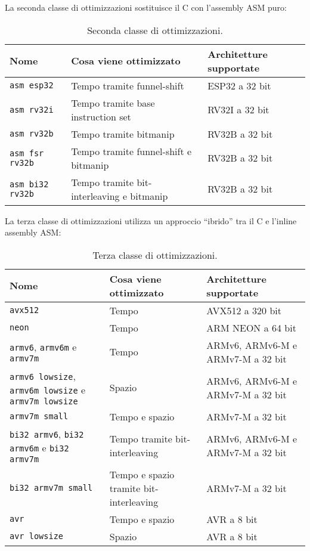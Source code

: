 \noindent La seconda classe di ottimizzazioni sostituisce il C con l'assembly ASM puro\cite{github}:
\begin{table}[H]
    \centering
	\begin{tabular}{|m{}<{\centering}||m{}<{\centering}|m{}<{\centering}|}
		\hline
		\textbf{Nome} & \textbf{Cosa viene ottimizzato} & \textbf{Architetture supportate} \\
        \hline \hline
        \texttt{asm esp32} & Tempo tramite funnel-shift & ESP32 a 32 bit \\
        \hline
        \texttt{asm rv32i} & Tempo tramite base instruction set & RV32I a 32 bit \\
        \hline
        \texttt{asm rv32b} & Tempo tramite bitmanip & RV32B a 32 bit \\
        \hline
        \texttt{asm fsr rv32b} & Tempo tramite funnel-shift e bitmanip & RV32B a 32 bit \\
        \hline
        \texttt{asm bi32 rv32b} & Tempo tramite bit-interleaving e bitmanip & RV32B a 32 bit \\
        \hline
    \end{tabular}
    \caption{Seconda classe di ottimizzazioni.}
\end{table}

\newpage

\noindent La terza classe di ottimizzazioni utilizza un approccio ``ibrido'' tra il C e l'inline assembly ASM\cite{github}:
\begin{table}[H]
    \centering
	\begin{tabular}{|m{}<{\centering}||m{}<{\centering}|m{}<{\centering}|}
		\hline
		\textbf{Nome} & \textbf{Cosa viene ottimizzato} & \textbf{Architetture supportate} \\
        \hline \hline
        \texttt{avx512} & Tempo & AVX512 a 320 bit \\
        \hline
        \texttt{neon} & Tempo & ARM NEON a 64 bit \\
        \hline
        \texttt{armv6}, \texttt{armv6m} e \texttt{armv7m} & Tempo & ARMv6, ARMv6-M e ARMv7-M a 32 bit \\
        \hline
        \texttt{armv6 lowsize}, \texttt{armv6m lowsize} e \texttt{armv7m lowsize} & Spazio & ARMv6, ARMv6-M e ARMv7-M a 32 bit \\
        \hline
        \texttt{armv7m small} & Tempo e spazio & ARMv7-M a 32 bit \\
        \hline
        \texttt{bi32 armv6}, \texttt{bi32 armv6m} e \texttt{bi32 armv7m} & Tempo tramite bit-interleaving & ARMv6, ARMv6-M e ARMv7-M a 32 bit \\
        \hline
        \texttt{bi32 armv7m small} & Tempo e spazio tramite bit-interleaving & ARMv7-M a 32 bit \\
        \hline
        \texttt{avr} & Tempo e spazio & AVR a 8 bit \\
        \hline
        \texttt{avr lowsize} & Spazio & AVR a 8 bit \\
        \hline
    \end{tabular}
    \caption{Terza classe di ottimizzazioni.}
\end{table}

